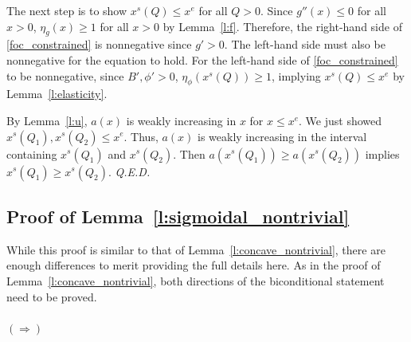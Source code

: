 \documentclass[12pt]{article}
\renewcommand{\qed}{{\it Q.E.D.}}
\newcommand{\efficacy}{\phi}
\newcommand{\general}{g}
\newcommand{\average}{a}
\newcommand{\benefit}{B}
\newcommand{\xshort}{x^{s}}
\newcommand{\xunit}{x^{e}}
\newcommand{\elasticity}[1]{\eta_{#1}}
\begin{document}
The next step is to show $\xshort(Q) \leq \xunit$ for all $Q > 0$. Since $\general''(x) \leq 0$ for all $x > 0$, $\elasticity{\general}(x) \geq 1$ for all $x > 0$ by Lemma~\ref{l:f}. Therefore, the right-hand side of \eqref{foc_constrained} is nonnegative since $g' > 0$. The left-hand side must also be nonnegative for the equation to hold. For the left-hand side of \eqref{foc_constrained} to be nonnegative, since $\benefit', \efficacy' > 0$, $\elasticity{\efficacy}(\xshort(Q)) \geq 1$, implying $\xshort(Q) \leq \xunit$ by Lemma~\ref{l:elasticity}.

By Lemma~\ref{l:u}, $\average(x)$ is weakly increasing in $x$ for $x \leq \xunit$. We just showed $\xshort(Q_1), \xshort(Q_2) \leq \xunit$. Thus, $\average(x)$ is weakly increasing in the interval containing $\xshort(Q_1)$ and $\xshort(Q_2)$. Then $\average(\xshort(Q_1)) \geq \average(\xshort(Q_2))$ implies $\xshort(Q_1) \geq \xshort(Q_2)$. \qed


\subsection*{Proof of Lemma~\ref{l:sigmoidal_nontrivial}}

While this proof is similar to that of
Lemma~\ref{l:concave_nontrivial}, there are enough differences to
merit providing the full details here. As in the proof of
Lemma~\ref{l:concave_nontrivial}, both directions of the biconditional
statement need to be proved.

\paragraph{$(\Longrightarrow)$}
\end{document}
